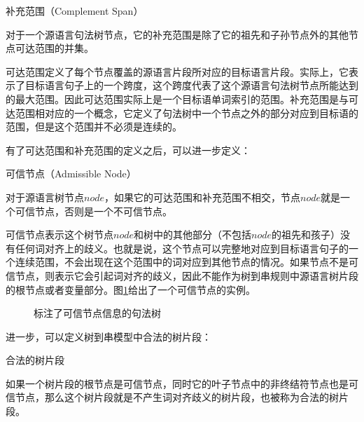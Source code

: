 \vspace{0.5em}
\begin{definition} 补充范围（Complement Span）

{\small
对于一个源语言句法树节点，它的补充范围是除了它的祖先和子孙节点外的其他节点可达范围的并集。
}
\end{definition}

\parinterval 可达范围定义了每个节点覆盖的源语言片段所对应的目标语言片段。实际上，它表示了目标语言句子上的一个跨度，这个跨度代表了这个源语言句法树节点所能达到的最大范围。因此可达范围实际上是一个目标语单词索引的范围。补充范围是与可达范围相对应的一个概念，它定义了句法树中一个节点之外的部分对应到目标语的范围，但是这个范围并不必须是连续的。

\parinterval 有了可达范围和补充范围的定义之后，可以进一步定义：

\vspace{0.5em}
\begin{definition} 可信节点（Admissible Node）

{\small
对于源语言树节点$node$，如果它的可达范围和补充范围不相交，节点$node$就是一个可信节点，否则是一个不可信节点。
}
\end{definition}

\parinterval 可信节点表示这个树节点$node$和树中的其他部分（不包括$node$的祖先和孩子）没有任何词对齐上的歧义。也就是说，这个节点可以完整地对应到目标语言句子的一个连续范围，不会出现在这个范围中的词对应到其他节点的情况。如果节点不是可信节点，则表示它会引起词对齐的歧义，因此不能作为树到串规则中源语言树片段的根节点或者变量部分。图\ref{fig:8-24}给出了一个可信节点的实例。

\begin{figure}[htp]
\centering

\caption{标注了可信节点信息的句法树}
\label{fig:8-24}
\end{figure}

\parinterval 进一步，可以定义树到串模型中合法的树片段：

\vspace{0.5em}
\begin{definition} 合法的树片段

{\small
如果一个树片段的根节点是可信节点，同时它的叶子节点中的非终结符节点也是可信节点，那么这个树片段就是不产生词对齐歧义的树片段，也被称为合法的树片段。
}
\end{definition}




